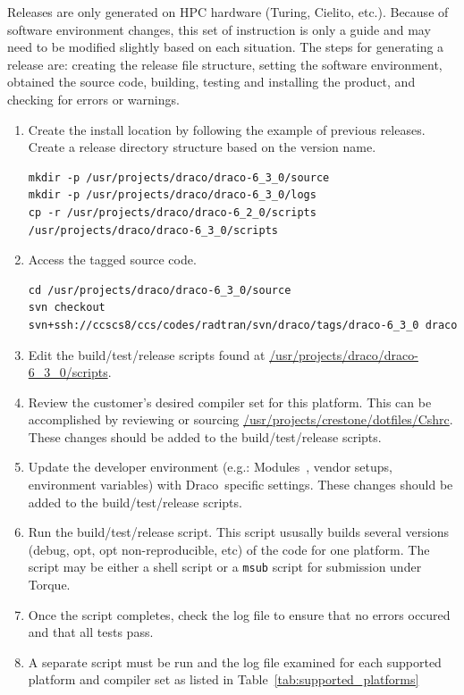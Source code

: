 \documentclass[note]{newmemo}
\newcommand{\draco}{{\normalfont\small\sffamily Draco}}
\begin{document}
Releases are only generated on HPC hardware (Turing, Cielito, etc.).
Because of software environment changes, this set of instruction is
only a guide and may need to be modified slightly based on each
situation. The steps for generating a release are: creating the
release file structure, setting the software environment, obtained the
source code, building, testing and installing the product, and
checking for errors or warnings.
%
\begin{enumerate}
\item Create the install location by following the example of previous
  releases.  Create a release directory structure based on the version
  name.
\begin{lstlisting}[basicstyle=\footnotesize, xleftmargin=0.20in, 
  xrightmargin=0.20in]
mkdir -p /usr/projects/draco/draco-6_3_0/source
mkdir -p /usr/projects/draco/draco-6_3_0/logs
cp -r /usr/projects/draco/draco-6_2_0/scripts /usr/projects/draco/draco-6_3_0/scripts
\end{lstlisting}
\item Access the tagged source code.
\begin{lstlisting}[basicstyle=\footnotesize, xleftmargin=1.0in, 
  xrightmargin=1.00in]
cd /usr/projects/draco/draco-6_3_0/source
svn checkout svn+ssh://ccscs8/ccs/codes/radtran/svn/draco/tags/draco-6_3_0 draco
\end{lstlisting}
\item Edit the build/test/release scripts found at
  \url{/usr/projects/draco/draco-6_3_0/scripts}. 
\item Review the customer's desired compiler set for this platform.
  This can be accomplished by reviewing or sourcing
  \url{/usr/projects/crestone/dotfiles/Cshrc}.  These changes should
  be added to the build/test/release scripts.
\item Update the developer environment (e.g.:
  Modules~\cite{modulecmd}, vendor setups, environment variables) with
  \draco\ specific settings.  These changes should be added to the
  build/test/release scripts.
\item Run the build/test/release script. This script ususally builds
  several versions (debug, opt, opt non-reproducible, etc) of the code
  for one platform.  The script may be either a shell script or a
  \texttt{msub} script for submission under Torque.
\item Once the script completes, check the log file to ensure that no
  errors occured and that all tests pass.
\item A separate script must be run and the log file examined for each
  supported platform and compiler set as listed in
  Table~\ref{tab:supported_platforms}
\end{enumerate}
\end{document}
